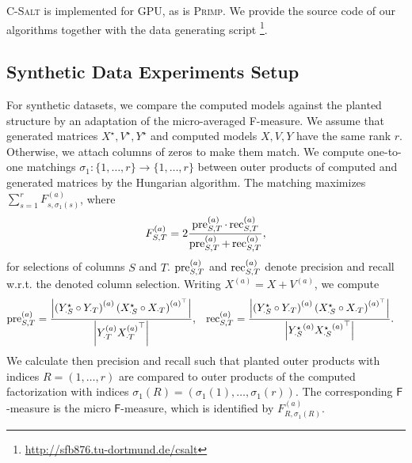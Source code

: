 \textsc{C-Salt} is implemented for GPU, as is \textsc{Primp}. We provide the source code of our algorithms together with the data generating script \footnote{\url{http://sfb876.tu-dortmund.de/csalt}}.
\subsection{Synthetic Data Experiments Setup}
For synthetic datasets, we compare the computed models against the planted structure by an adaptation of the micro-averaged F-measure.
We assume that generated matrices  $X^\star,V^\star,Y^\star$ and computed models $X,V,Y$ have the same rank $r$. Otherwise, we attach columns of zeros to make them match.
We compute one-to-one matchings $\sigma_1:\{1,\ldots, r\}\rightarrow \{1,\ldots,r\}$ between outer products of computed and generated matrices by the Hungarian algorithm. The matching maximizes $\sum_{s=1}^rF^{(a)}_{s,\sigma_1(s)}$, where 
\[
	F^{(a)}_{S,T}=2\frac{\operatorname{pre}^{(a)}_{S,T}\cdot\operatorname{rec}^{(a)}_{S,T}}{\operatorname{pre}^{(a)}_{S,T}+\operatorname{rec}^{(a)}_{S,T}},
\]
for selections of columns $S$ and $T$. $\operatorname{pre}^{(a)}_{S,T}$ and $\operatorname{rec}^{(a)}_{S,T}$ denote precision and recall w.r.t. the denoted column selection. Writing $X^{(a)}=X+V^{(a)}$, we compute
\begin{align*}
	\operatorname{pre}^{(a)}_{S,T} &= \frac{\left|\left({Y^\star_{\cdot S}}\circ Y_{\cdot T}\right)^{(a)}\left({X^\star_{\cdot S}}\circ X_{\cdot T}\right)^{(a)^\top }\right|}{\left|Y^{(a)}_{\cdot T}{X^{(a)}_{\cdot T}}^\top \right|}, &
    \operatorname{rec}^{(a)}_{S,T} &= \frac{\left|\left({Y^\star_{\cdot S}}\circ Y_{\cdot T}\right)^{(a)}\left({X^\star_{\cdot S}}\circ X_{\cdot T}\right)^{(a)^\top }\right|}{\left|{Y^\star_{\cdot S}}^{(a)}{{X^\star_{\cdot S}}^{(a)}}^\top \right|}.
\end{align*}
We calculate then precision and recall such that planted outer products with indices $R=(1,\ldots, r)$ are compared to outer products of the computed factorization with indices $\sigma_1(R)=(\sigma_1(1),\ldots,\sigma_1(r))$. The corresponding $\mathsf{F}$-measure is the micro $\mathsf{F}$-measure, which is identified by $F^{(a)}_{R,\sigma_1(R)}$.

